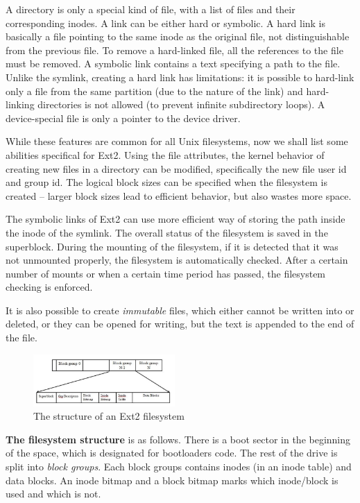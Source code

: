 \documentclass{acm_proc_article-sp}
\begin{document}
A directory is only a special kind of file, with a list of files and their corresponding inodes. A link can be either hard or symbolic. A hard link is basically a file pointing to the same inode as the original file, not distinguishable from the previous file. To remove a hard-linked file, all the references to the file must be removed. A symbolic link contains a text specifying a path to the file. Unlike the symlink, creating a hard link has limitations: it is possible to hard-link only a file from the same partition (due to the nature of the link) and hard-linking directories is not allowed (to prevent infinite subdirectory loops). A device-special file is only a pointer to the device driver.

While these features are common for all Unix filesystems, now we shall list some abilities specifical for Ext2. Using the file attributes, the kernel behavior of creating new files in a directory can be modified, specifically the new file user id and group id. The logical block sizes can be specified when the filesystem is created -- larger block sizes lead to efficient behavior, but also wastes more space.

The symbolic links of Ext2 can use more efficient way of storing the path inside the inode of the symlink. The overall status of the filesystem is saved in the superblock. During the mounting of the filesystem, if it is detected that it was not unmounted properly, the filesystem is automatically checked. After a certain number of mounts or when a certain time period has passed, the filesystem checking is enforced.

It is also possible to create {\it immutable} files, which either cannot be written into or deleted, or they can be opened for writing, but the text is appended to the end of the file.

\begin{figure}
\centering
\includegraphics[width=0.48\textwidth]{images/ext2structure.jpg}
	\caption{The structure of an Ext2 filesystem \cite{ext2structure}}
\end{figure}

{\bf The filesystem structure} is as follows. There is a boot sector in the beginning of the space, which is designated for bootloaders code. The rest of the drive is split into {\it block groups}. Each block groups contains inodes (in an inode table) and data blocks. An inode bitmap and a block bitmap marks which inode/block is used and which is not. 
\end{document}
